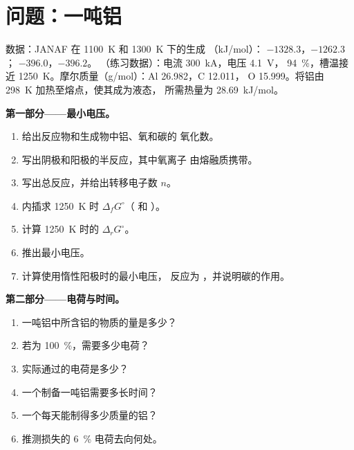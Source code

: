 \section{问题：一吨铝}

\begin{problem}
\label{pb:b2:batteries-electrolysis:1}
数据：JANAF 在 \qty{1100}{K} 和 \qty{1300}{K} 下的生成
（\unit{kJ/mol}）： $-1328.3$，$-1262.3$； $-396.0$，$-396.2$。
（练习数据）：电流 \qty{300}{kA}，电压 \qty{4.1}{V}，
94~\%，槽温接近 \qty{1250}{K}。摩尔质量（\unit{g/mol}）：Al 26.982，C 12.011，
O 15.999。将铝由 \qty{298}{K} 加热至熔点，使其成为液态，
所需热量为 \qty{28.69}{kJ/mol}。

\medskip
\noindent\textbf{第一部分——最小电压。}
\begin{enumerate}
  \item 给出反应物和生成物中铝、氧和碳的
        氧化数。
  \item 写出阴极和阳极的半反应，其中氧离子
         由熔融质携带。
  \item 写出总反应，并给出转移电子数 $n$。
  \item 内插求 \qty{1250}{K} 时 $\Delta_f G^\circ$（ 和 ）。
  \item 计算 \qty{1250}{K} 时的 $\Delta_r G^\circ$。
  \item 推出最小电压。
  \item 计算使用惰性阳极时的最小电压，
        反应为 ，并说明碳的作用。
\end{enumerate}

\medskip
\noindent\textbf{第二部分——电荷与时间。}
\begin{enumerate}[resume]
  \item 一吨铝中所含铝的物质的量是多少？
  \item 若为 100~\%，需要多少电荷？
  \item 实际通过的电荷是多少？
  \item 一个制备一吨铝需要多长时间？
  \item 一个每天能制得多少质量的铝？
  \item 推测损失的 6~\% 电荷去向何处。
\end{enumerate}


\end{problem}
